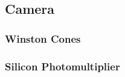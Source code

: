 \cite{famous:eichler}

\subsection{Camera}\label{iceact:model:camera}


\subsubsection{Winston Cones}


\subsubsection{Silicon Photomultiplier}


